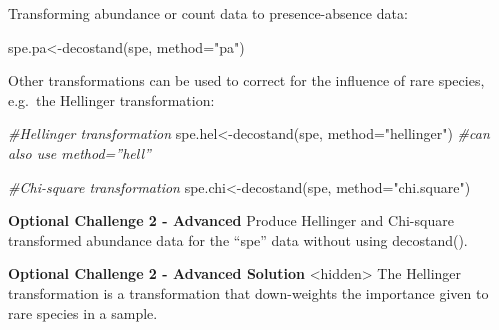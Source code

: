 \documentclass[
]{book}
\newenvironment{Shaded}{\begin{snugshade}}{\end{snugshade}}
\newcommand{\AttributeTok}[1]{\textcolor[rgb]{0.77,0.63,0.00}{#1}}
\newcommand{\CommentTok}[1]{\textcolor[rgb]{0.56,0.35,0.01}{\textit{#1}}}
\newcommand{\FunctionTok}[1]{\textcolor[rgb]{0.00,0.00,0.00}{#1}}
\newcommand{\NormalTok}[1]{#1}
\newcommand{\OtherTok}[1]{\textcolor[rgb]{0.56,0.35,0.01}{#1}}
\newcommand{\StringTok}[1]{\textcolor[rgb]{0.31,0.60,0.02}{#1}}
\begin{document}
Transforming abundance or count data to presence-absence data:

\begin{Shaded}
\begin{Highlighting}[]
\NormalTok{spe.pa}\OtherTok{\textless{}{-}}\FunctionTok{decostand}\NormalTok{(spe, }\AttributeTok{method=}\StringTok{"pa"}\NormalTok{) }
\end{Highlighting}
\end{Shaded}

Other transformations can be used to correct for the influence of rare
species, e.g.~the Hellinger transformation:

\begin{Shaded}
\begin{Highlighting}[]
\CommentTok{\#Hellinger transformation}
\NormalTok{spe.hel}\OtherTok{\textless{}{-}}\FunctionTok{decostand}\NormalTok{(spe, }\AttributeTok{method=}\StringTok{"hellinger"}\NormalTok{) }\CommentTok{\#can also use method=”hell”}

\CommentTok{\#Chi{-}square transformation}
\NormalTok{spe.chi}\OtherTok{\textless{}{-}}\FunctionTok{decostand}\NormalTok{(spe, }\AttributeTok{method=}\StringTok{"chi.square"}\NormalTok{)}
\end{Highlighting}
\end{Shaded}

\textbf{Optional Challenge 2 - Advanced} Produce Hellinger and Chi-square
transformed abundance data for the ``spe'' data without using decostand().

\textbf{Optional Challenge 2 - Advanced Solution} \textless hidden\textgreater{} The Hellinger
transformation is a transformation that down-weights the importance
given to rare species in a sample.
\end{document}
